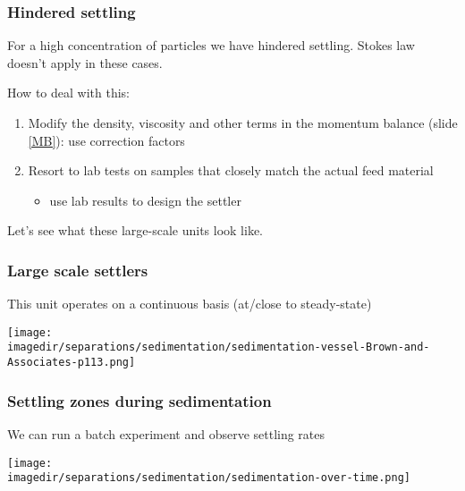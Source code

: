 \begin{frame}\frametitle{Hindered settling}
	For a high concentration of particles we have hindered settling. Stokes law doesn't apply in these cases.
	
	\vspace{12pt}
	How to deal with this:
	\begin{enumerate}
		\item	Modify the density, viscosity and other terms in the momentum balance (slide \ref{MB}): use correction factors
		\item	Resort to lab tests on samples that closely match the actual feed material
		\begin{itemize}
			\item	use lab results to design the settler
		\end{itemize}
	\end{enumerate}
	
	\vspace{12pt}
	Let's see what these large-scale units look like.
\end{frame}

\begin{frame}\frametitle{Large scale settlers}
	This unit operates on a continuous basis (at/close to {\color{myOrange}steady-state})
	\begin{center}
		\texttt{[image: \\imagedir/separations/sedimentation/sedimentation-vessel-Brown-and-Associates-p113.png]}
	\end{center}
\end{frame}

\begin{frame}\frametitle{Settling zones during sedimentation}
	We can run a batch experiment and observe settling rates
	\begin{center}
		\texttt{[image: \\imagedir/separations/sedimentation/sedimentation-over-time.png]}
	\end{center}
\end{frame}

